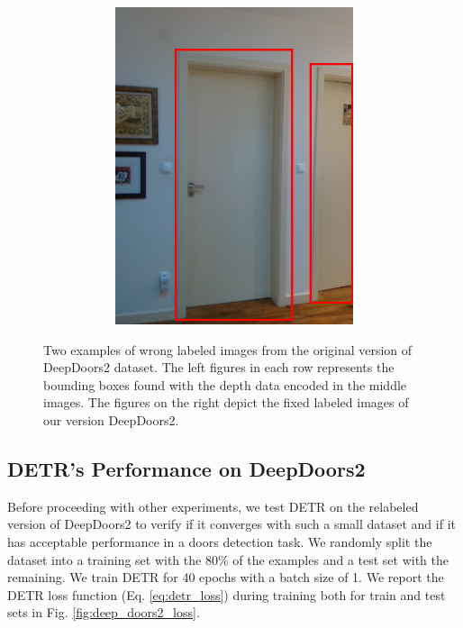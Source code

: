 \begin{figure}[h!]
\begin{subfigure}[b]{\linewidth}
\begin{subfigure}[b]{0.21\linewidth}
			\includegraphics[width=\linewidth]{images/deep_doors_2_labeling2_correct.png}
		\end{subfigure}
	\hfil
		\caption{}
	\end{subfigure}
	\caption{Two examples of wrong labeled images from the original version of DeepDoors2 dataset. The left figures in each row represents the bounding boxes found with the depth data encoded in the middle images. The figures on the right depict the fixed labeled images of our version DeepDoors2.}
	\label{fig:relabeling_deepdoors2}
\end{figure}

\subsection{DETR's Performance on DeepDoors2}

Before proceeding with other experiments, we test DETR on the relabeled version of DeepDoors2 to verify if it converges with such a small dataset and if it has acceptable performance in a doors detection task. We randomly split the dataset into a training set with the $80\%$ of the examples and a test set with the remaining. We train DETR for 40 epochs with a batch size of 1. We report the DETR loss function (Eq. \ref{eq:detr_loss}) during training both for train and test sets in Fig. \ref{fig:deep_doors2_loss}.

